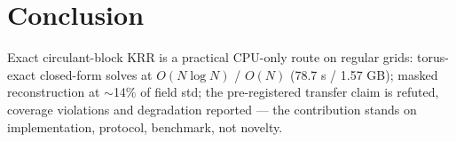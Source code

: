 \documentclass{article}
\begin{document}
\section*{Conclusion}
Exact circulant-block KRR is a practical CPU-only route on regular grids:
torus-exact closed-form solves at $O(N\log N)$ / $O(N)$ (78.7 s / 1.57 GB);
masked reconstruction at $\sim$14\% of field std; the pre-registered
transfer claim is refuted, coverage violations and degradation reported
--- the contribution stands on implementation, protocol, benchmark, not
novelty.

\clearpage
{\footnotesize
\setlength{\bibsep}{0pt}
\setlength{\parskip}{0pt}
\setlength{\topsep}{0pt}
\setlength{\parsep}{0pt}


}
\end{document}
